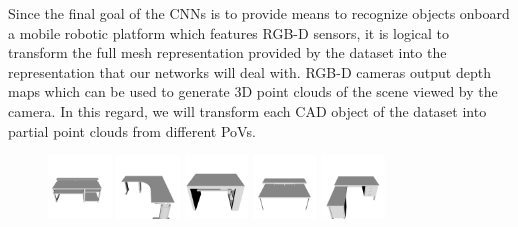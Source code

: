 Since the final goal of the \acp{CNN} is to provide means to recognize objects onboard a mobile robotic platform which features \ac{RGB-D} sensors, it is logical to transform the full mesh representation provided by the dataset into the representation that our networks will deal with. \ac{RGB-D} cameras output depth maps which can be used to generate \acs{3D} point clouds of the scene viewed by the camera. In this regard, we will transform each \ac{CAD} object of the dataset into partial point clouds from different \acp{PoV}.

\clearpage

\begin{figure}[!t]
	\centering
	\includegraphics[width=0.15\textwidth]{Figures/ObjRecog/desk_0}\hfill
	\includegraphics[width=0.15\textwidth]{Figures/ObjRecog/desk_1}\hfill
	\includegraphics[width=0.15\textwidth]{Figures/ObjRecog/desk_2}\hfill
	\includegraphics[width=0.15\textwidth]{Figures/ObjRecog/desk_3}\hfill
	\includegraphics[width=0.15\textwidth]{Figures/ObjRecog/desk_4}\hfill


\end{figure}
